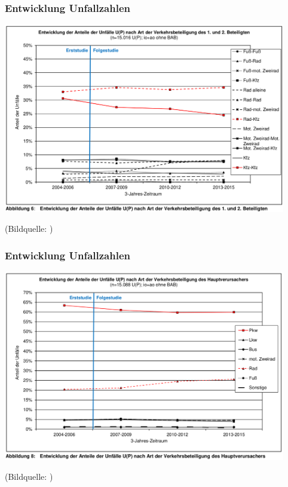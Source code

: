 \documentclass{beamer}
\begin{document}
\begin{frame}
  \frametitle{Entwicklung Unfallzahlen}

  \centering
  
  \includegraphics[width=0.925\textwidth]{img/anteil-unfaelle-beteiligte.png}
  
    {\scriptsize (Bildquelle: \citealt[S.~11]{Baier2018})\par}
\end{frame}

\begin{frame}
  \frametitle{Entwicklung Unfallzahlen}

  \centering
  
  \includegraphics[width=0.925\textwidth]{img/hauptverursacher.png}
  
    {\scriptsize (Bildquelle: \citealt[S.~13]{Baier2018})\par}
\end{frame}
\end{document}
